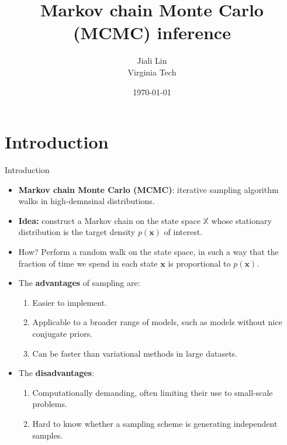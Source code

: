 \documentclass[10pt,mathserif]{beamer}
\title{\large \bfseries Markov chain Monte Carlo (MCMC) inference}
\author{Jiali Lin\\[3ex]
Virginia Tech}
\date{\today}
\begin{document}
\frame{
\thispagestyle{empty}
\titlepage
}

\section{Introduction}
\begin{frame}{Introduction}
\begin{itemize}
    \item  \textbf{Markov chain Monte Carlo (MCMC)}: iterative sampling algorithm walks in high-demnsinal distributions.
    \item \textbf{Idea:} construct a Markov chain on the state space $\mathbb{X}$ whose stationary distribution is the target density $p(\bm{x})$ of interest.
    \item How? Perform a random walk on the state space, in such a way that the fraction of time we spend in each state $\bm{x}$ is proportional to $p(\bm{x})$.
    \item The \textbf{advantages} of sampling are: 
    \begin{enumerate}
        \item Easier to implement.
        \item Applicable to a broader range of models, such as models without nice conjugate priors.
        \item Can be faster than variational methods in large datasets.
    \end{enumerate}
    \item The \textbf{disadvantages}:
    \begin{enumerate}
        \item Computationally demanding, often limiting their use to small-scale problems.
         \item Hard to know whether a sampling scheme is generating independent samples.
    \end{enumerate}
\end{itemize}
\end{frame}
\end{document}
